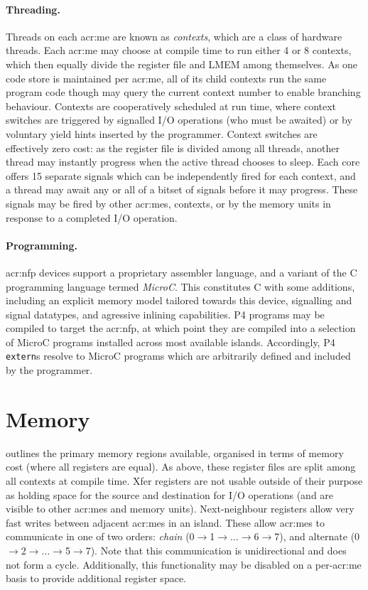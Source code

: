 \paragraph{Threading.}
Threads on each \gls{acr:me} are known as \emph{contexts}, which are a class of hardware threads.
Each \gls{acr:me} may choose at compile time to run either 4 or 8 contexts, which then equally divide the register file and LMEM among themselves.
As one code store is maintained per \gls{acr:me}, all of its child contexts run the same program code though may query the current context number to enable branching behaviour.
Contexts are cooperatively scheduled at run time, where context switches are triggered by signalled I/O operations (who must be awaited) or by voluntary yield hints inserted by the programmer.
Context switches are effectively zero cost: as the register file is divided among all threads, another thread may instantly progress when the active thread chooses to sleep.
Each core offers \num{15} separate signals which can be independently fired for each context, and a thread may await any or all of a bitset of signals before it may progress.
These signals may be fired by other \glspl{acr:me}, contexts, or by the memory units in response to a completed I/O operation.

\paragraph{Programming.}
\gls{acr:nfp} devices support a proprietary assembler language, and a variant of the C programming language termed \emph{MicroC}.
This constitutes C with some additions, including an explicit memory model tailored towards this device, signalling and signal datatypes, and agressive inlining capabilities.
P4 programs may be compiled to target the \gls{acr:nfp}, at which point they are compiled into a selection of MicroC programs installed across most available islands.
Accordingly, P4 \texttt{extern}s resolve to MicroC programs which are arbitrarily defined and included by the programmer.

\section{Memory}
 outlines the primary memory regions available, organised in terms of memory cost (where all registers are equal).
As above, these register files are split among all contexts at compile time.
Xfer registers are not usable outside of their purpose as holding space for the source and destination for I/O operations (and are visible to other \glspl{acr:me} and memory units).
Next-neighbour registers allow very fast writes between adjacent \glspl{acr:me} in an island.
These allow \glspl{acr:me} to communicate in one of two orders: \emph{chain} (0$\rightarrow$1$\rightarrow\dots\rightarrow$6$\rightarrow$7), and alternate (0$\rightarrow$2$\rightarrow\dots\rightarrow$5$\rightarrow$7).
Note that this communication is unidirectional and does not form a cycle.
Additionally, this functionality may be disabled on a per-\gls{acr:me} basis to provide additional register space.

